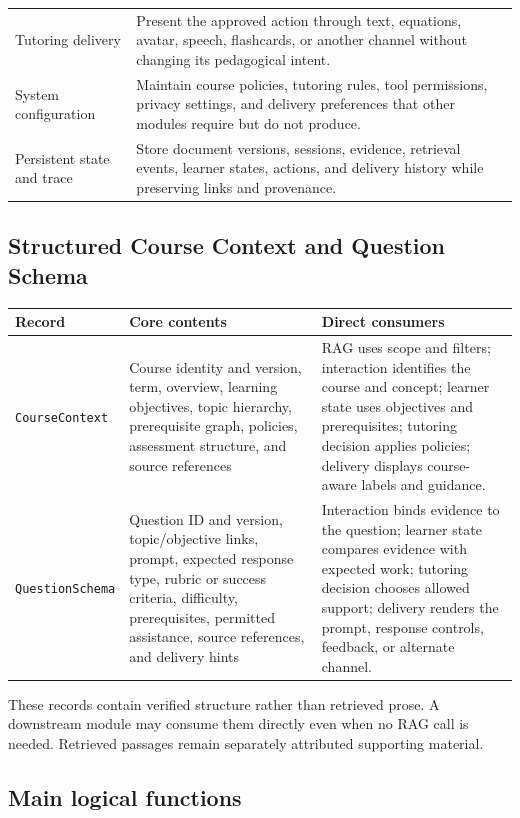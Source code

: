 \documentclass[11pt]{article}
\begin{document}
\begin{tabularx}{\textwidth}{@{}p{}X@{}}
Tutoring delivery & Present the approved action through text, equations, avatar, speech, flashcards, or another channel without changing its pedagogical intent. \\
System configuration & Maintain course policies, tutoring rules, tool permissions, privacy settings, and delivery preferences that other modules require but do not produce. \\
Persistent state and trace & Store document versions, sessions, evidence, retrieval events, learner states, actions, and delivery history while preserving links and provenance. \\
\bottomrule
\end{tabularx}

\subsection{Structured Course Context and Question Schema}

\begin{tabularx}{\textwidth}{@{}p{}p{}X@{}}
\toprule
\textbf{Record} & \textbf{Core contents} & \textbf{Direct consumers} \\
\midrule
\texttt{CourseContext} & Course identity and version, term, overview, learning objectives, topic hierarchy, prerequisite graph, policies, assessment structure, and source references & RAG uses scope and filters; interaction identifies the course and concept; learner state uses objectives and prerequisites; tutoring decision applies policies; delivery displays course-aware labels and guidance. \\
\texttt{QuestionSchema} & Question ID and version, topic/objective links, prompt, expected response type, rubric or success criteria, difficulty, prerequisites, permitted assistance, source references, and delivery hints & Interaction binds evidence to the question; learner state compares evidence with expected work; tutoring decision chooses allowed support; delivery renders the prompt, response controls, feedback, or alternate channel. \\
\bottomrule
\end{tabularx}

These records contain verified structure rather than retrieved prose. A downstream module may consume them directly even when no RAG call is needed. Retrieved passages remain separately attributed supporting material.

\subsection{Main logical functions}
\end{document}
